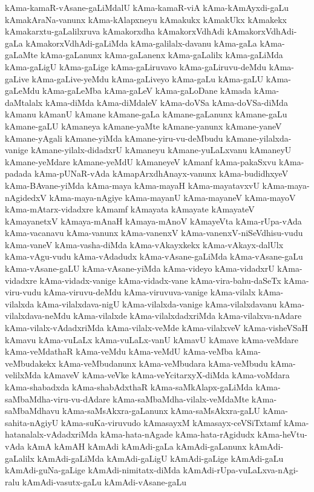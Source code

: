 {kAma-kamaR-vAsane-gaLiMdalU
kAma-kamaR-viA
kAma-kAmAyxdi-gaLu
kAmakAraNa-vanunx
kAma-kAlapxneyu
kAmakukx
kAmakUkx
kAmakekx
kAmakarxtu-gaLalilxruva
kAmakorxdha
kAmakorxVdhAdi
kAmakorxVdhAdi-gaLa
kAmakorxVdhAdi-gaLiMda
kAma-galilalx-davanu
kAma-gaLa
kAma-gaLaMte
kAma-gaLanunx
kAma-gaLanenx
kAma-gaLalilx
kAma-gaLiMda
kAma-gaLigU
kAma-gaLige
kAma-gaLiruvavo
kAma-gaLiruvu-deMdu
kAma-gaLive
kAma-gaLive-yeMdu
kAma-gaLiveyo
kAma-gaLu
kAma-gaLU
kAma-gaLeMdu
kAma-gaLeMba
kAma-gaLeV
kAma-gaLoDane
kAmada
kAma-daMtalalx
kAma-diMda
kAma-diMdaleV
kAma-doVSa
kAma-doVSa-diMda
kAmanu
kAmanU
kAmane
kAmane-gaLa
kAmane-gaLanunx
kAmane-gaLu
kAmane-gaLU
kAmaneya
kAmane-yaMte
kAmane-yanunx
kAmane-yaneV
kAmane-yAgali
kAmane-yiMda
kAmane-yiru-vu-deMbudu
kAmane-yilalxda-vanige
kAmane-yilalx-didadxrU
kAmaneyu
kAmane-yuLaLxvanu
kAmaneyU
kAmane-yeMdare
kAmane-yeMdU
kAmaneyeV
kAmanf
kAma-pakaSxvu
kAma-padada
kAma-pUNaR-vAda
kAmapArxdhAnayx-vanunx
kAma-budidhxyeV
kAma-BAvane-yiMda
kAma-maya
kAma-mayaH
kAma-mayatavxvU
kAma-maya-nAgidedxV
kAma-maya-nAgiye
kAma-mayanU
kAma-mayaneV
kAma-mayoV
kAma-mAtarx-vidadxre
kAmamf
kAmayata
kAmayate
kAmayateV
kAmayanetxV
kAmaya-mAnaH
kAmaya-mAnoV
kAmayeVta
kAma-rUpa-vAda
kAma-vacanavu
kAma-vanunx
kAma-vanenxV
kAma-vanenxV-niSeVdhisu-vudu
kAma-vaneV
kAma-vasha-diMda
kAma-vAkayxkekx
kAma-vAkayx-dalUlx
kAma-vAgu-vudu
kAma-vAdadudx
kAma-vAsane-gaLiMda
kAma-vAsane-gaLu
kAma-vAsane-gaLU
kAma-vAsane-yiMda
kAma-videyo
kAma-vidadxrU
kAma-vidadxre
kAma-vidadx-vanige
kAma-vidadx-vane
kAma-vira-bahu-daSeTx
kAma-viru-vudu
kAma-viruvu-deMdu
kAma-viruvuva-vanige
kAma-vilalx
kAma-vilalxda
kAma-vilalxdava-nigU
kAma-vilalxda-vanige
kAma-vilalxdavanu
kAma-vilalxdava-neMdu
kAma-vilalxde
kAma-vilalxdadxriMda
kAma-vilalxva-nAdare
kAma-vilalx-vAdadxriMda
kAma-vilalx-veMde
kAma-vilalxveV
kAma-visheVSaH
kAmavu
kAma-vuLaLx
kAma-vuLaLx-vanU
kAmavU
kAmave
kAma-veMdare
kAma-veMdathaR
kAma-veMdu
kAma-veMdU
kAma-veMba
kAma-veMbudakekx
kAma-veMbudanunx
kAma-veMbudara
kAma-veMbudu
kAma-velilxMda
kAmaveV
kAma-veVke
kAma-veYcitarxyX-diMda
kAma-voMdara
kAma-shabadxda
kAma-shabAdxthaR
kAma-saMkAlapx-gaLiMda
kAma-saMbaMdha-viru-vu-dAdare
kAma-saMbaMdha-vilalx-veMdaMte
kAma-saMbaMdhavu
kAma-saMsAkxra-gaLanunx
kAma-saMsAkxra-gaLU
kAma-sahita-nAgiyU
kAma-suKa-viruvudo
kAmasayxM
kAmasayx-ceVSiTxtamf
kAma-hatanalalx-vAdadxriMda
kAma-hata-nAgade
kAma-hata-rAgidudx
kAma-heVtu-vAda
kAmA
kAmAH
kAmAdi
kAmAdi-gaLa
kAmAdi-gaLanunx
kAmAdi-gaLalilx
kAmAdi-gaLiMda
kAmAdi-gaLigU
kAmAdi-gaLige
kAmAdi-gaLu
kAmAdi-guNa-gaLige
kAmAdi-nimitatx-diMda
kAmAdi-rUpa-vuLaLxva-nAgi-ralu
kAmAdi-vasutx-gaLu
kAmAdi-vAsane-gaLu
}
